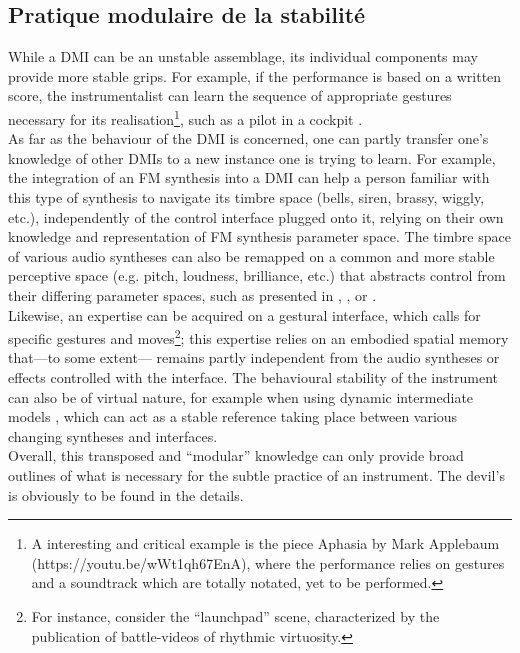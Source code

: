 \subsection{Pratique modulaire de la stabilité}
While a DMI can be an unstable assemblage, its individual components may provide more stable grips. For example, if the performance is based on a written score, the instrumentalist can learn the sequence of appropriate gestures necessary for its realisation\footnote{A interesting and critical example is the piece Aphasia by Mark Applebaum (https://youtu.be/wWt1qh67EnA), where the performance relies on gestures and a soundtrack which are totally notated, yet to be performed.}, such as a pilot in a cockpit \cite{vertegaal_towards_1996}.\\
\indent As far as the behaviour of the DMI is concerned, one can partly transfer one's knowledge of other DMIs to a new instance one is trying to learn. For example, the integration of an FM synthesis into a DMI can help a person familiar with this type of synthesis to navigate its timbre space (bells, siren, brassy, wiggly, etc.), independently of the control interface plugged onto it, relying on their own knowledge and representation of FM synthesis parameter space. The timbre space of various audio syntheses can also be remapped on a common and more stable perceptive space (e.g. pitch, loudness, brilliance, etc.) that abstracts control from their differing parameter spaces, such as presented in \cite{wessel_timbre_1979}, \cite{arfib_strategies_2002}, \cite{schwarz_sound_2012} or \cite{tubb_divergent_2014}.\\
\indent Likewise, an expertise can be acquired on a gestural interface, which calls for specific gestures and moves\footnote{For instance, consider the “launchpad” scene, characterized by the publication of battle-videos of rhythmic virtuosity.}; this expertise relies on an embodied spatial memory that—to some extent— remains partly independent from the audio syntheses or effects controlled with the interface. The behavioural stability of the instrument can also be of virtual nature, for example when using dynamic intermediate models \cite{goudard_dynamic_2011}, which can act as a stable reference taking place between various changing syntheses and interfaces.\\
\indent Overall, this transposed and “modular” knowledge can only provide broad outlines of what is necessary for the subtle practice of an instrument. The devil's is obviously to be found in the details.

